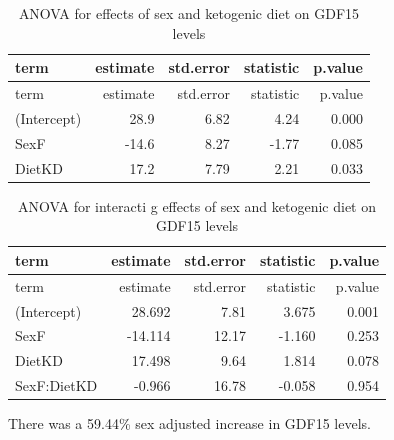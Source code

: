 \documentclass[]{article}
\newenvironment{Shaded}{\begin{snugshade}}{\end{snugshade}}
\newcommand{\DataTypeTok}[1]{\textcolor[rgb]{0.13,0.29,0.53}{#1}}
\newcommand{\KeywordTok}[1]{\textcolor[rgb]{0.13,0.29,0.53}{\textbf{#1}}}
\newcommand{\NormalTok}[1]{#1}
\newcommand{\OperatorTok}[1]{\textcolor[rgb]{0.81,0.36,0.00}{\textbf{#1}}}
\newcommand{\StringTok}[1]{\textcolor[rgb]{0.31,0.60,0.02}{#1}}
\begin{document}
\begin{longtable}[]{@{}lrrrr@{}}
\caption{ANOVA for effects of sex and ketogenic diet on GDF15
levels}\tabularnewline
\toprule
term & estimate & std.error & statistic & p.value\tabularnewline
\midrule
\endfirsthead
\toprule
term & estimate & std.error & statistic & p.value\tabularnewline
\midrule
\endhead
(Intercept) & 28.9 & 6.82 & 4.24 & 0.000\tabularnewline
SexF & -14.6 & 8.27 & -1.77 & 0.085\tabularnewline
DietKD & 17.2 & 7.79 & 2.21 & 0.033\tabularnewline
\bottomrule
\end{longtable}

\begin{Shaded}
\end{Shaded}

\begin{longtable}[]{@{}lrrrr@{}}
\caption{ANOVA for interacti g effects of sex and ketogenic diet on
GDF15 levels}\tabularnewline
\toprule
term & estimate & std.error & statistic & p.value\tabularnewline
\midrule
\endfirsthead
\toprule
term & estimate & std.error & statistic & p.value\tabularnewline
\midrule
\endhead
(Intercept) & 28.692 & 7.81 & 3.675 & 0.001\tabularnewline
SexF & -14.114 & 12.17 & -1.160 & 0.253\tabularnewline
DietKD & 17.498 & 9.64 & 1.814 & 0.078\tabularnewline
SexF:DietKD & -0.966 & 16.78 & -0.058 & 0.954\tabularnewline
\bottomrule
\end{longtable}

There was a 59.44\% sex adjusted increase in GDF15 levels.
\end{document}
